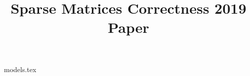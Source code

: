 \documentclass[sigconf]{acmart}
\begin{document}
\title{Sparse Matrices Correctness 2019 Paper}
\maketitle

{models.tex}



\end{document}
